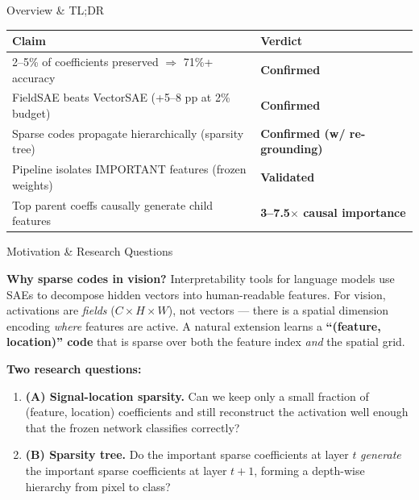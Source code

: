 \documentclass[final]{beamer}
\newlength{\colwidth}
\begin{document}
\begin{frame}[t]
\begin{columns}[t]
\begin{column}{\colwidth}
\begin{block}{Overview \& TL;DR}
\vspace{0.4em}
\begin{center}
\begin{tabular}{@{}ll@{}}
\toprule
\textbf{Claim} & \textbf{Verdict} \\
\midrule
2--5\% of coefficients preserved $\Rightarrow$ 71\%+ accuracy & \textcolor{AccentGreen}{\textbf{Confirmed}} \\
FieldSAE beats VectorSAE (+5--8 pp at 2\% budget) & \textcolor{AccentGreen}{\textbf{Confirmed}} \\
Sparse codes propagate hierarchically (sparsity tree) & \textcolor{AccentGreen}{\textbf{Confirmed (w/ re-grounding)}} \\
Pipeline isolates IMPORTANT features (frozen weights) & \textcolor{AccentGreen}{\textbf{Validated}} \\
Top parent coeffs causally generate child features & \textcolor{AccentGreen}{\textbf{3--7.5$\times$ causal importance}} \\
\bottomrule
\end{tabular}
\end{center}
\end{block}

\vspace{0.5em}

\begin{block}{Motivation \& Research Questions}
\small

\textbf{Why sparse codes in vision?}
Interpretability tools for language models use SAEs to decompose hidden vectors
into human-readable features.  For vision, activations are \emph{fields}
($C{\times}H{\times}W$), not vectors --- there is a spatial dimension encoding
\emph{where} features are active.  A natural extension learns a
\textbf{``(feature, location)'' code} that is sparse over both the feature index
\emph{and} the spatial grid.

\vspace{0.5em}
\textbf{Two research questions:}
\begin{enumerate}[leftmargin=1.5em,itemsep=2pt]
  \item \textbf{(A) Signal-location sparsity.}  Can we keep only a small fraction
        of (feature, location) coefficients and still reconstruct the activation
        well enough that the frozen network classifies correctly?
  \item \textbf{(B) Sparsity tree.}  Do the important sparse coefficients at layer
        $t$ \emph{generate} the important sparse coefficients at layer $t{+}1$,
        forming a depth-wise hierarchy from pixel to class?
\end{enumerate}


\end{block}
\end{column}
\end{columns}
\end{frame}
\end{document}
